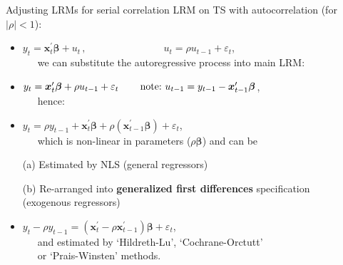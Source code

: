 \documentclass{beamer}
\begin{document}
\begin{frame}{Adjusting LRMs for serial correlation}
LRM on TS with autocorrelation (for $|\rho|<1$):\\ \medskip
\begin{itemize}
    \item $y_t=\bm{x}_t^{\prime} \bm{\beta} + u_t \,,\qquad \qquad \qquad~~~~~~~\, u_t = \rho u_{t-1}+\varepsilon_t$,\\ \medskip
    ~~~we can substitute the autoregressive process into main LRM:\\ \bigskip
    \item $y_t=\bm{x}_t^{\prime} \bm{\beta} +\rho u_{t-1}+\varepsilon_t \, \qquad \textnormal{note:~} u_{t-1} = y_{t-1} - \bm{x}_{t-1}^{\prime} \bm{\beta} $, \\ \medskip ~~~hence: \\ \medskip
    \item $y_t= \rho y_{t-1} + \bm{x}_t^{\prime} \bm{\beta} + \rho (\bm{x}_{t-1}^{\prime} \bm{\beta}) + \varepsilon_t$, \\ \medskip 
    ~~~which is non-linear in parameters ($\rho \bm{\beta}$) and can be \\ \medskip
    \item[(a)] Estimated by NLS (general regressors)\\ \medskip
    \item[(b)] Re-arranged into \textbf{generalized first differences} specification \\
    (exogenous regressors)\\ \medskip
    \item $y_t - \rho y_{t-1} =  ( \bm{x}_t^{\prime} - \rho \bm{x}_{t-1}^{\prime}) \bm{\beta} + \varepsilon_t$,\\ \medskip
    ~~~and estimated by `Hildreth-Lu', `Cochrane-Orctutt' \\ 
    ~~~or `Prais-Winsten' methods.
\end{itemize}
\end{frame}
\end{document}
